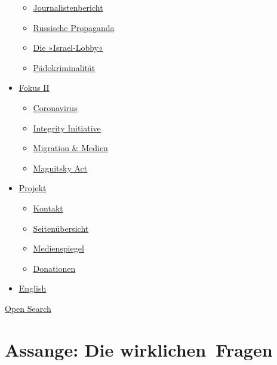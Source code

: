 \begin{itemize}
  \begin{itemize}
  \tightlist
  \item
    \href{https://swprs.org/bericht-eines-journalisten/}{Journalistenbericht}
  \item
    \href{https://swprs.org/russische-propaganda/}{Russische Propaganda}
  \item
    \href{https://swprs.org/die-israel-lobby-fakten-und-mythen/}{Die
    »Israel-Lobby«}
  \item
    \href{https://swprs.org/geopolitik-und-paedokriminalitaet/}{Pädokriminalität}
  \end{itemize}
\item
  \href{https://swprs.org/migration-und-medien/}{Fokus II}

  \begin{itemize}
  \tightlist
  \item
    \href{https://swprs.org/covid-19-hinweis-ii/}{Coronavirus}
  \item
    \href{https://swprs.org/die-integrity-initiative/}{Integrity
    Initiative}
  \item
    \href{https://swprs.org/migration-und-medien/}{Migration \& Medien}
  \item
    \href{https://swprs.org/der-fall-magnitsky/}{Magnitsky Act}
  \end{itemize}
\item
  \href{https://swprs.org/kontakt/}{Projekt}

  \begin{itemize}
  \tightlist
  \item
    \href{https://swprs.org/kontakt/}{Kontakt}
  \item
    \href{https://swprs.org/uebersicht/}{Seitenübersicht}
  \item
    \href{https://swprs.org/medienspiegel/}{Medienspiegel}
  \item
    \href{https://swprs.org/donationen/}{Donationen}
  \end{itemize}
\item
  \href{https://swprs.org/contact/}{English}
\end{itemize}

\protect\hyperlink{}{Open Search}

\hypertarget{assange-die-wirklichen-fragen}{%
\section{Assange: Die
wirklichen~Fragen}\label{assange-die-wirklichen-fragen}}

